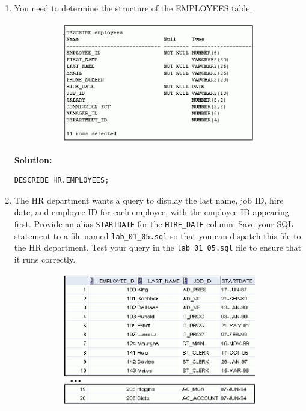 \documentclass[a4paper,12pt]{article}
\begin{document}
\begin{enumerate}[start=4]
    \newpage
    \item You need to determine the structure of the EMPLOYEES table.
    \begin{figure}[h]
        \centering
        \begin{subfigure}[b]{0.3\linewidth}
            \centering
            \includegraphics[width=1.5\linewidth]{graphics/5.png}
        \end{subfigure}
    \end{figure}
    
    \textbf{Solution: }
    \begin{lstlisting}[language=SQL]
DESCRIBE HR.EMPLOYEES;
    \end{lstlisting}
    
    \item The HR department wants a query to display the last name, job ID, hire date, and employee ID for each employee, with the employee ID appearing first. Provide an alias \texttt{STARTDATE} for the \texttt{HIRE\_DATE} column. Save your SQL statement to a file named \texttt{lab\_01\_05.sql} so that you can dispatch this file to the HR department.
    Test your query in the \texttt{lab\_01\_05.sql} file to ensure that it runs correctly.
    \begin{figure}[h]
        \centering
        \begin{subfigure}[b]{0.6\linewidth}
            \centering
            \includegraphics[width=\linewidth]{graphics/6.png}
        \end{subfigure}
    \end{figure}
    

\end{enumerate}
\end{document}
